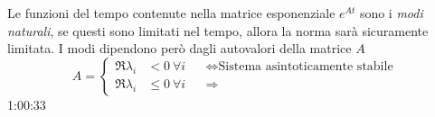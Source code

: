 Le funzioni del tempo contenute nella matrice esponenziale $e^{At}$ sono i
\textit{modi naturali}, se questi sono limitati nel tempo, allora la norma sarà
sicuramente limitata. I modi dipendono però dagli autovalori della matrice $A$
$$
A = \left\{\begin{aligned}
\Re{\lambda_i}&<0 \ \forall i & &\Leftrightarrow \text{Sistema asintoticamente
stabile}\\
\Re{\lambda_i} &\leq 0 \ \forall i & &\Rightarrow
\end{aligned}
\right.$$
1:00:33
